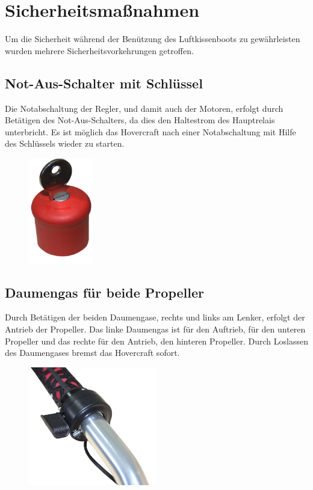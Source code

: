 
\section{Sicherheitsmaßnahmen}
Um die Sicherheit während der Benützung des Luftkissenboots zu gewährleisten wurden mehrere Sicherheitsvorkehrungen getroffen.
\subsection{Not-Aus-Schalter mit Schlüssel}
Die Notabschaltung der Regler, und damit auch der Motoren, erfolgt durch Betätigen des Not-Aus-Schalters, da dies den Haltestrom des Hauptrelais unterbricht. 
Es ist möglich das Hovercraft nach einer Notabschaltung mit Hilfe des Schlüssels wieder zu starten. 

\begin{figure}[h]
    \centering
    \includegraphics[width=0.25\textwidth]{Fotos/Notaus.png}
\end{figure}
  
\newpage
\subsection{Daumengas für beide Propeller}
Durch Betätigen der beiden Daumengase, rechts und links am Lenker, erfolgt der Antrieb der Propeller. Das linke Daumengas ist für den Auftrieb, für den unteren Propeller und
das rechte für den Antrieb, den hinteren Propeller. Durch Loslassen des Daumengases bremst das Hovercraft sofort.

\begin{figure}[h]
    \centering
    \includegraphics[width=0.5\textwidth]{Fotos/Daumengas.png}
\end{figure}


